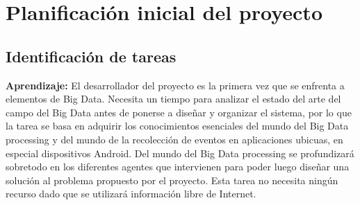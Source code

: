 \chapter{Planificación inicial del proyecto}
\section{Identificación de tareas}
\textbf{Aprendizaje:} El desarrollador del proyecto es la primera vez que se enfrenta a elementos de Big Data. Necesita un tiempo para analizar el estado del arte del campo del Big Data antes de ponerse a diseñar y organizar el sistema, por lo que la tarea se basa en adquirir los conocimientos esenciales del mundo del Big Data processing y del mundo de la recolección de eventos en aplicaciones ubicuas, en especial dispositivos Android. Del mundo del Big Data processing se profundizará sobretodo en los diferentes agentes que intervienen para poder luego diseñar una solución al problema propuesto por el proyecto. Esta tarea no necesita ningún recurso dado que se utilizará información libre de Internet.

